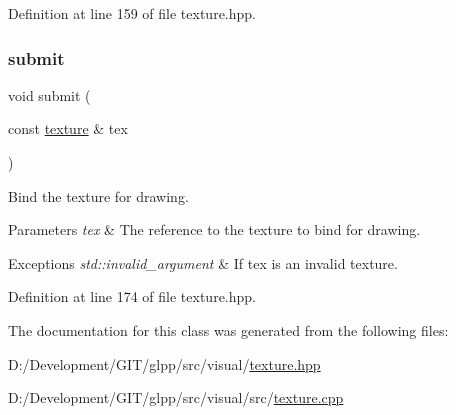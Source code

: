 Definition at line 159 of file texture.\+hpp.

\mbox{\label{classglpp_1_1texture_ac40bc6b16cee4dbf15c0562ce550da18}} 
\subsubsection{\texorpdfstring{submit}{submit}}
{\footnotesize\ttfamily void submit (\begin{DoxyParamCaption}\item[{const \hyperlink{classglpp_1_1texture}{texture} \&}]{tex }\end{DoxyParamCaption})\hspace{0.3cm}{\ttfamily [friend]}}



Bind the texture for drawing. 


\begin{DoxyParams}{Parameters}
{\em tex} & The reference to the texture to bind for drawing. \\
\hline
\end{DoxyParams}

\begin{DoxyExceptions}{Exceptions}
{\em std\+::invalid\+\_\+argument} & If {\ttfamily tex} is an invalid texture. \\
\hline
\end{DoxyExceptions}


Definition at line 174 of file texture.\+hpp.



The documentation for this class was generated from the following files\+:\begin{DoxyCompactItemize}
\item 
D\+:/\+Development/\+G\+I\+T/glpp/src/visual/\hyperlink{texture_8hpp}{texture.\+hpp}\item 
D\+:/\+Development/\+G\+I\+T/glpp/src/visual/src/\hyperlink{texture_8cpp}{texture.\+cpp}\end{DoxyCompactItemize}
